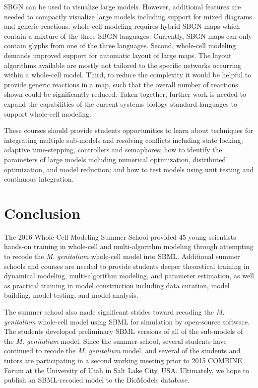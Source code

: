 \documentclass[journal,transmag]{IEEEtran}
\begin{document}
 SBGN can be used to visualize large models. However, additional features are needed to compactly visualize large models including support for mixed diagrams and generic reactions. whole-cell modeling requires hybrid SBGN maps which contain a mixture of the three SBGN languages. Currently, SBGN maps can only contain glyphs from one of the three languages. Second, whole-cell modeling demands improved support for automatic layout of large maps. The layout algorithms available are mostly not tailored to the specific networks occurring within a whole-cell model.  Third, to reduce the complexity it would be helpful to provide generic reactions in a map, such that the overall number of reactions shown could be significantly reduced.
Taken together, further work is needed to expand the capabilities of the current systems biology standard languages to support whole-cell modeling.

These courses should provide students opportunities to learn about techniques for integrating multiple sub-models and resolving conflicts including state locking, adaptive time-stepping, controllers and semaphores; how to identify the parameters of large models including numerical optimization, distributed optimization, and model reduction; and how to test models using unit testing and continuous integration. 

\section{Conclusion}
The 2016 Whole-Cell Modeling Summer School provided 45 young scientists hands-on training in whole-cell and multi-algorithm modeling through attempting to recode the \textit{M. genitalium} whole-cell model into SBML. Additional summer schools and courses are needed to provide students deeper theoretical training in dynamical modeling, multi-algorithm modeling, and parameter estimation, as well as practical training in model construction including data curation, model building, model testing, and model analysis.

The summer school also made significant strides toward recoding the \textit{M. genitalium} whole-cell model using SBML for simulation by open-source software. The students developed preliminary SBML versions of all of the sub-models of the \textit{M. genitalium} model. Since the summer school, several students have continued to recode the \textit{M. genitalium} model, and several of the students and tutors are participating in a second working meeting prior to 2015 COMBINE Forum at the University of Utah in Salt Lake City, USA. Ultimately, we hope to publish an SBML-recoded model to the BioModels database. 
\end{document}
